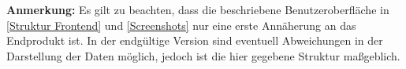 	
	


\textbf{Anmerkung:}
Es gilt zu beachten, dass die beschriebene Benutzeroberfläche in \autoref{Struktur Frontend} und \autoref{Screenshots} nur eine erste Annäherung an das Endprodukt ist. In der endgültige Version sind eventuell Abweichungen in der Darstellung der Daten möglich, jedoch ist die hier gegebene Struktur maßgeblich.
